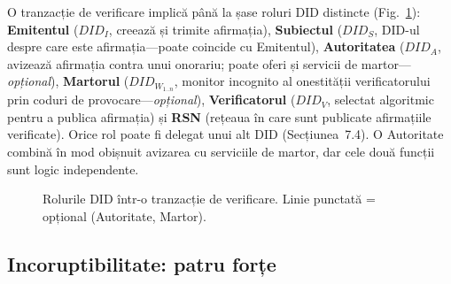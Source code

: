 \documentclass[11pt,a4paper,twocolumn]{article}
\begin{document}
O tranzacție de verificare implică până la șase roluri DID distincte (Fig.~\ref{fig:roles}): \textbf{Emitentul} ($DID_I$, creează și trimite afirmația), \textbf{Subiectul} ($DID_S$, DID-ul despre care este afirmația---poate coincide cu Emitentul), \textbf{Autoritatea} ($DID_A$, avizează afirmația contra unui onorariu; poate oferi și servicii de martor---\emph{opțional}), \textbf{Martorul} ($DID_{W_{1..n}}$, monitor incognito al onestității verificatorului prin coduri de provocare---\emph{opțional}), \textbf{Verificatorul} ($DID_V$, selectat algoritmic pentru a publica afirmația) și \textbf{RSN} (rețeaua în care sunt publicate afirmațiile verificate). Orice rol poate fi delegat unui alt DID (Secțiunea~7.4). O Autoritate combină în mod obișnuit avizarea cu serviciile de martor, dar cele două funcții sunt logic independente.

\begin{figure}[ht]
\centering
{}
\caption{Rolurile DID într-o tranzacție de verificare. Linie punctată = opțional (Autoritate, Martor).}
\label{fig:roles}
\end{figure}

\subsection{Incoruptibilitate: patru forțe}
\end{document}
